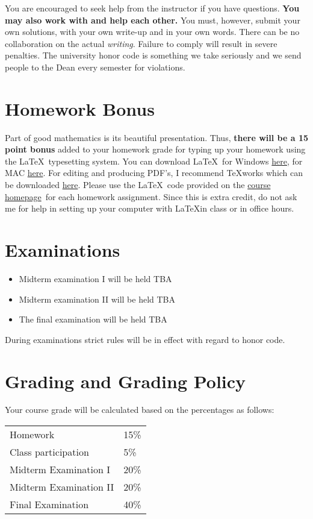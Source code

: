 \documentclass[12pt]{article}
\newcommand{\ingreen}[1]{\color{green}\textbf{#1} \color{black}}
\newcommand{\coursewebpage}{\href{https://github.com/kapelner/QC_Math_241_Fall_2014_15}{course homepage}}
\begin{document}
You are encouraged to seek help from the instructor if you have questions. \ingreen{You may also work with and help each other.} You must, however, submit your own solutions, with your own write-up and in your own words. There can be no collaboration on the actual \textit{writing}. Failure to comply will result in severe penalties. The university honor code is something we take seriously and we send people to the Dean every semester for violations.

\section*{Homework Bonus}

Part of good mathematics is its beautiful presentation. Thus, \ingreen{there will be a 15 point bonus} added to your homework grade  for typing up your homework using the \LaTeX ~typesetting system. You can download \LaTeX ~for Windows \href{http://www.miktex.org/download}{here}, for MAC \href{http://www.tug.org/mactex/}{here}. For editing and producing PDF's, I recommend \TeX works which can be downloaded \href{http://www.tug.org/texworks/#Getting_TeXworks}{here}. Please use the \LaTeX ~code provided on the \coursewebpage ~for each homework assignment. Since this is extra credit, do not ask me for help in setting up your computer with \LaTeX in class or in office hours.

\section*{Examinations}

\begin{itemize}
\itemsep -0.0em 
\item Midterm examination I will be held TBA
\item Midterm examination II will be held TBA
\item The final examination will be held TBA
\end{itemize}

During examinations strict rules will be in effect with regard to honor code.

\section*{Grading and Grading Policy}

Your course grade will be calculated based on the percentages as follows: 

\begin{table}[htp]
\centering
\begin{tabular}{l|l}
Homework & 15\% \\
Class participation & 5\% \\
Midterm Examination I & 20\%\\
Midterm Examination II & 20\%\\
Final Examination & 40\%
\end{tabular}
\end{table}
\end{document}
